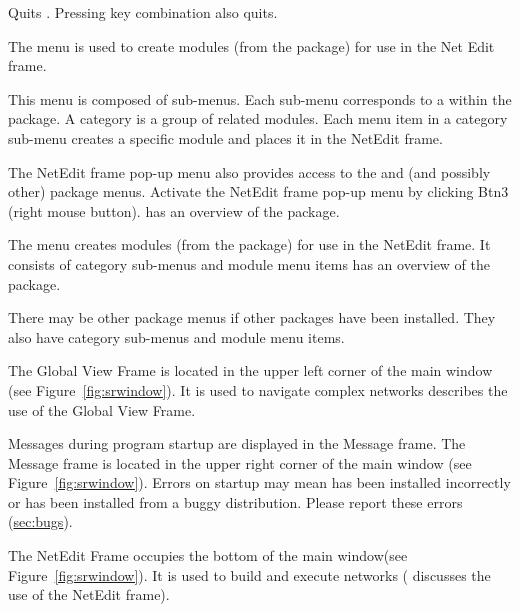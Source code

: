 \begin{description}
\begin{description}
\begin{description}
       Quits \sr{}.  Pressing key combination
       also quits.
    \end{description}
  \end{description}
  
  \begin{description}
     The  menu is used to create modules
    (from the \sr{} package) for use in the Net Edit frame.

    This menu is composed of sub-menus. Each sub-menu corresponds to
     a 
     within the \sr{} package.  A category is a group of
    related modules.  Each menu item in a category sub-menu creates a
    specific module and places it in the NetEdit frame.  
    
    The NetEdit frame pop-up menu  also
    provides access to the \menu{\sr{}} and \menu{\biopse{}} (and
    possibly other) package menus. Activate the NetEdit frame pop-up
    menu by clicking Btn3 (right mouse button).  has an overview of the
    \sr{} package.
  \end{description}

  \begin{description}
     The  menu creates modules (from the
    \biopse package) for use in the NetEdit frame.  It consists of
    category sub-menus and module menu items  has an overview of the \biopse{}package.
  \end{description}

  \begin{description}
     There may be other
    package menus if other packages have been installed.  They also
    have category sub-menus and module menu items.
  \end{description}
  
   
  The Global View Frame is located in the
  upper left corner of the main window (see
  Figure~\ref{fig:srwindow}). It is used to navigate complex networks
   describes the use of the Global View Frame.
  
   
  Messages during program startup are displayed
  in the Message frame.  The Message frame is located in the upper right
  corner of the main window (see Figure~\ref{fig:srwindow}).  Errors on
  startup may mean \sr{} has been installed incorrectly or has
  been installed from a buggy distribution.  Please report these
  errors (\hyperref{report}{see Section~}{)}{sec:bugs}).
  
   
  The NetEdit Frame occupies the bottom of
  the main window(see Figure~\ref{fig:srwindow}).  It is used to build
  and execute networks (
  discusses the use of the NetEdit frame).

\end{description}

